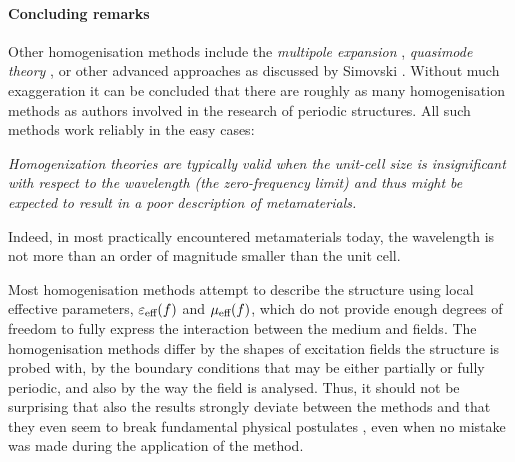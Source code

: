 \paragraph{Concluding remarks}%
Other homogenisation methods include the \textit{multipole expansion} \cite{vynck2009all, chipouline2012metamaterials, petschulat2008multipole}, \textit{quasimode theory} \cite{sun2009effective}, or other advanced approaches as discussed by Simovski \cite{simovski2007bloch, simovski2009material, simovski2011electromagnetic, tsukerman2011nonlocal}.
Without much exaggeration it can be concluded that there are roughly as many homogenisation methods as authors involved in the research of periodic structures. All such methods work reliably in the easy cases:
\begin{displayquote}
\textit{Homogenization theories are typically valid when the unit-cell size is insignificant with respect to the wavelength (the zero-frequency limit) and thus might be expected to result in a poor description of metamaterials.}
\cite{smith2006homogenization} 
\end{displayquote}
Indeed, in most practically encountered metamaterials today, the wavelength is not more than an order of magnitude smaller than the unit cell. %

Most homogenisation methods attempt to describe the structure using local effective parameters,  $\varepsilon_{\text{eff} }(f)$ and $\mu_{\text{eff} }(f)$, which do not provide enough degrees of freedom to fully express the interaction between the medium and fields. The homogenisation methods differ by the shapes of excitation fields the structure is probed with, by the  boundary conditions that may be either partially or fully periodic, and also by the way the field is analysed. Thus, it should not be surprising that also the results strongly deviate between the methods \cite[Fig. 5]{smith2006homogenization} %
and that they even seem to break fundamental physical postulates \cite{koschny2003resonant}, even when no mistake was made during the application of the method. 

